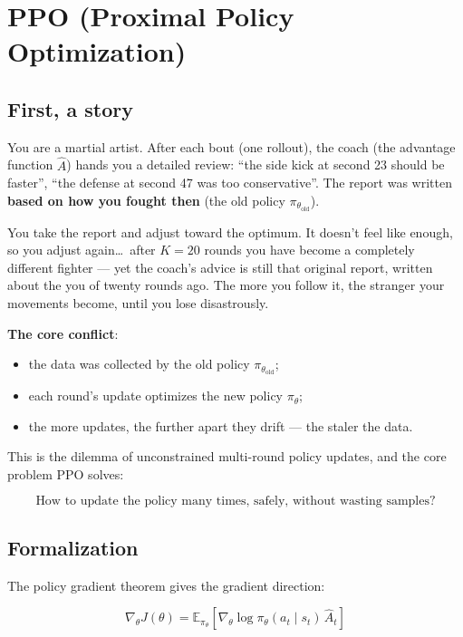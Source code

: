 \documentclass{article}
\begin{document}
\section*{PPO (Proximal Policy Optimization)}

\subsection*{First, a story}

You are a martial artist. After each bout (one rollout), the coach (the advantage function $\hat{A}$) hands you a detailed review: ``the side kick at second 23 should be faster'', ``the defense at second 47 was too conservative''. The report was written \textbf{based on how you fought then} (the old policy $\pi_{\theta_{\text{old}}}$).

You take the report and adjust toward the optimum. It doesn't feel like enough, so you adjust again\ldots\ after $K=20$ rounds you have become a completely different fighter --- yet the coach's advice is still that original report, written about the you of twenty rounds ago. The more you follow it, the stranger your movements become, until you lose disastrously.

\textbf{The core conflict}:
\begin{itemize}
  \item the data was collected by the old policy $\pi_{\theta_\text{old}}$;
  \item each round's update optimizes the new policy $\pi_\theta$;
  \item the more updates, the further apart they drift --- the staler the data.
\end{itemize}

This is the dilemma of unconstrained multi-round policy updates, and the core problem PPO solves:

\[
\boxed{\text{How to update the policy many times, safely, without wasting samples?}}
\]

\subsection*{Formalization}

The policy gradient theorem gives the gradient direction:

\[
\nabla_\theta J(\theta) = \mathbb{E}_{\pi_\theta}\!\left[\nabla_\theta \log \pi_\theta(a_t \mid s_t)\,\hat{A}_t\right]
\]
\end{document}

